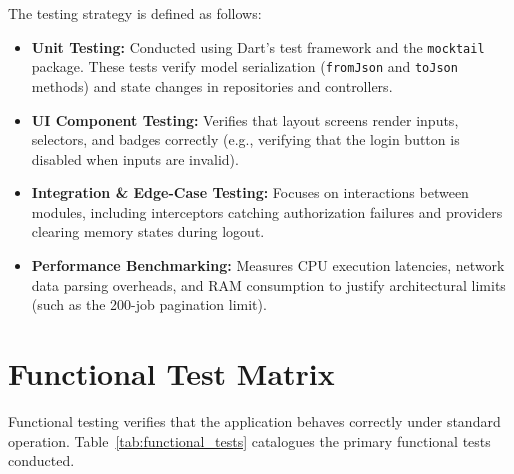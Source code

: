 The testing strategy is defined as follows:
\begin{itemize}
    \item \textbf{Unit Testing:} Conducted using Dart's test framework and the \texttt{mocktail} package. These tests verify model serialization (\texttt{fromJson} and \texttt{toJson} methods) and state changes in repositories and controllers.
    \item \textbf{UI Component Testing:} Verifies that layout screens render inputs, selectors, and badges correctly (e.g., verifying that the login button is disabled when inputs are invalid).
    \item \textbf{Integration \& Edge-Case Testing:} Focuses on interactions between modules, including interceptors catching authorization failures and providers clearing memory states during logout.
    \item \textbf{Performance Benchmarking:} Measures CPU execution latencies, network data parsing overheads, and RAM consumption to justify architectural limits (such as the 200-job pagination limit).
\end{itemize}

\section{Functional Test Matrix}
Functional testing verifies that the application behaves correctly under standard operation. Table~\ref{tab:functional_tests} catalogues the primary functional tests conducted.

